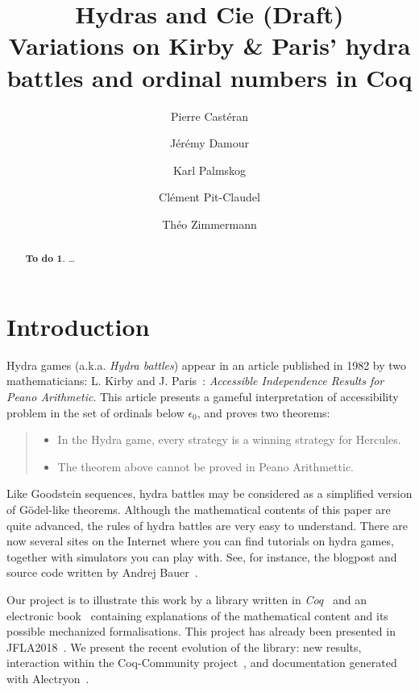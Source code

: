 \documentclass{easychair}
\title{Hydras and Cie (Draft) \\
  Variations on Kirby \& Paris' hydra battles and ordinal numbers in Coq}
\author{
Pierre Castéran \inst{1}
\and
    Jérémy Damour \inst{2}
\and
Karl Palmskog \inst{2}
\and Clément Pit-Claudel \inst{2}
\and Théo Zimmermann %
}
\institute{
 LaBRI, Université Bordeaux \\
  \email{pierre.casteran@labri.fr}
\and
   Ask for agreement !
 }
\newtheorem{todo}{To do}
\begin{document}
\maketitle


\begin{abstract}
  \begin{todo}
 \dots
  \end{todo}
\end{abstract}




\section{Introduction}
\label{sect:introduction}
Hydra games (a.k.a. \emph{Hydra battles}) appear in an article published in 1982 by two mathematicians:
L. Kirby and J. Paris~\cite{KP82}: \emph{Accessible Independence Results for Peano Arithmetic}.
This article presents a gameful interpretation of accessibility problem in the set of ordinals below $\epsilon_0$, and proves two theorems:
\begin{quote}
\begin{itemize}
\item In the Hydra game, every strategy is a winning strategy for Hercules.
  \item The theorem above cannot be proved in Peano Arithmettic.
\end{itemize}
\end{quote}

Like Goodstein sequences, hydra battles may be considered as a simplified version of G\"{o}del-like theorems.
Although the mathematical contents of this 
paper are quite advanced, the rules of hydra battles are very easy to understand. There are now several sites on the Internet where you can find tutorials on hydra games, together with simulators you can play with. See, for instance, the blogpost and source code written by Andrej Bauer~\cite{bauer2008,BauerHydra}.

Our project is to illustrate  this work by a library written in \emph{Coq}~\cite{HydraBattles} and an electronic book~\cite{HydraBook}  containing explanations of the mathematical content and its possible mechanized formalisations.
This project has already been presented in
JFLA2018~\cite{JFLA2018paper}. We present the recent evolution of the library: new results, interaction within the Coq-Community project~\cite{CoqCommunity}, and documentation generated with Alectryon~\cite{alectryonpaper, alectryongithub}. 
\end{document}
